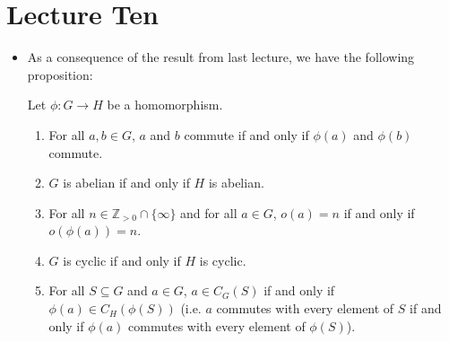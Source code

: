 \section{Lecture Ten}
\begin{itemize}
    \item As a consequence of the result from last lecture, we have the following proposition:
    \begin{proposition}
        Let $\phi:G\rightarrow H$ be a homomorphism.
        \begin{enumerate}
            \item For all $a,b \in G$, $a$ and $b$ commute if and only if $\phi(a)$ and $\phi(b)$ commute.
            \item $G$ is abelian if and only if $H$ is abelian.
            \item For all $n\in \mathbb{Z}_{>0} \cap \{\infty\}$ and for all $a\in G$, $o(a)=n$ if and only if $o(\phi(a))=n$.
            \item $G$ is cyclic if and only if $H$ is cyclic.
            \item For all $S \subseteq G$ and $a \in G$, $a\in C_G(S)$ if and only if $\phi(a) \in C_H(\phi(S))$ (i.e. $a$ commutes with every element of $S$ if and only if $\phi(a)$ commutes with every element of $\phi(S)$).
            

\end{enumerate}
\end{proposition}
\end{itemize}
